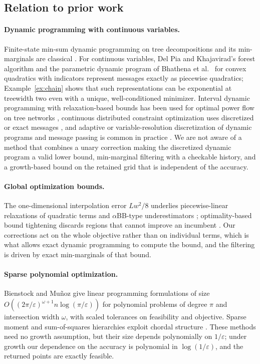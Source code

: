 \subsection{Relation to prior work}
\paragraph{Dynamic programming with continuous variables.}
Finite-state min-sum dynamic programming on tree decompositions and its
min-marginals are classical
\cite{Bertele1972,Dechter1999,WainwrightJaakkolaWillsky2005,KohliTorr2007}.
For continuous variables, Del Pia and Khajavirad's forest algorithm
\cite{DelPiaKhajavirad2026} and the parametric dynamic program of
Bhathena et al.\ \cite{Bhathena2026} for convex quadratics with indicators
represent messages exactly as piecewise quadratics; Example~\ref{ex:chain}
shows that such representations can be exponential at treewidth two even
with a unique, well-conditioned minimizer. Interval dynamic programming
with relaxation-based bounds has been used for optimal power flow on tree
networks \cite{Dvijotham2017}, continuous distributed constraint
optimization uses discretized or exact messages \cite{Hoang2020}, and
adaptive or variable-resolution discretization of dynamic programs and
message passing is common in practice
\cite{MunosMoore2002,LeaverFay2005,Parisot2014,Troullinos2022}. We are
not aware of a method that combines a unary correction making the
discretized dynamic program a valid lower bound, min-marginal filtering
with a checkable history, and a growth-based bound on the retained grid
that is independent of the accuracy.

\paragraph{Global optimization bounds.}
The one-dimensional interpolation error $Lw^2/8$ underlies piecewise-linear
relaxations of quadratic terms \cite{Beach2022,DongLuo2018} and
$\alpha$BB-type underestimators \cite{Adjiman1998}; optimality-based bound
tightening discards regions that cannot improve an incumbent
\cite{Belotti2009,GleixnerBertholdMuller2017}. Our corrections act on the
whole objective rather than on individual terms, which is what allows exact
dynamic programming to compute the bound, and the filtering is driven by
exact min-marginals of that bound.

\paragraph{Sparse polynomial optimization.}
Bienstock and Mu\~noz \cite{BienstockMunoz2018} give linear programming
formulations of size $O((2\pi/\varepsilon)^{\omega+1}n\log(\pi/\varepsilon))$
for polynomial problems of degree $\pi$ and intersection width $\omega$, with
scaled tolerances on feasibility and objective. Sparse moment and
sum-of-squares hierarchies exploit chordal structure
\cite{Waki2006,Lasserre2006}. These methods need no growth assumption, but
their size depends polynomially on $1/\varepsilon$; under growth our
dependence on the accuracy is polynomial in $\log(1/\varepsilon)$, and the
returned points are exactly feasible.

